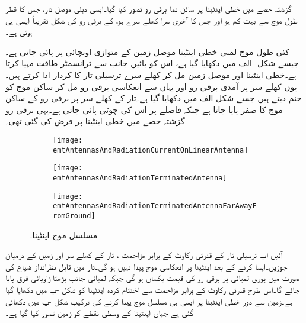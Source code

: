 گزشتہ حصے میں خطی اینٹینا پر سائن نما برقی رو تصور کیا گیا۔ایسی دبلی موصل تار، جس کا قطر  طول موج  سے بہت کم ہو  اور جس کا آخری سرا کھلے سرے ہو، کے برقی رو کی شکل تقریباً ایسی ہی ہوتی ہے۔

کئی طول موج لمبی خطی اینٹینا موصل زمین کے متوازی  اونچائی پر پائی جاتی ہے۔ جیسے شکل -الف میں دکھایا گیا ہے، اس کو بائیں جانب سے ٹرانسمٹر طاقت مہیا کرتا ہے۔خطی اینٹینا اور موصل زمین مل کر کھلے سرے ترسیلی تار کا کردار ادا کرتے ہیں۔یوں کھلے سر پر آمدی برقی رو اور یہاں سے انعکاسی برقی رو مل کر ساکن موج کو جنم دیتے ہیں جسے شکل-الف میں دکھایا گیا ہے۔تار کے کھلے سر پر برقی رو کے ساکن موج کا صفر پایا جاتا ہے جبکہ   فاصلے پر اس کی چوٹی پائی جاتی ہے۔یہی برقی رو گزشتہ حصے میں خطی اینٹینا پر فرض کی گئی تھی۔

\begin{figure}
\centering
\begin{subfigure}{1\textwidth}
\centering
\texttt{[image: emtAntennasAndRadiationCurrentOnLinearAntenna]}
\end{subfigure}
\par\bigskip
\begin{subfigure}{1\textwidth}
\centering
\texttt{[image: emtAntennasAndRadiationTerminatedAntenna]}
\end{subfigure}
\par\bigskip
\begin{subfigure}{1\textwidth}
\centering
\texttt{[image: emtAntennasAndRadiationTerminatedAntennaFarAwayFromGround]}
\end{subfigure}
\caption{مسلسل موج اینٹینا۔}
\label{شکل_اینٹینا_موصل_سطح_خطی_اینٹینا_رو}
\end{figure}

آئیں اب ترسیلی تار کے قدرتی رکاوٹ کے برابر مزاحمت ،  تار کے کھلے سر اور زمین کے درمیان جوڑیں۔ایسا کرنے کے بعد اینٹینا پر انعکاسی موج پیدا نہیں ہو گی۔تار میں قابل نظرانداز ضیاع کی صورت میں پوری لمبائی پر برقی رو کی قیمت یکساں ہو گی جبکہ لمبائی جانب بڑھتا زاویائی فرق پایا جائے گا۔اس طرح قدرتی رکاوٹ کے برابر مزاحمت سے اختتام کردہ اینٹینا کو شکل -ب میں دکھایا گیا ہے۔زمین سے دور خطی اینٹینا پر ایسی ہی مسلسل موج پیدا کرنے کی ترکیب شکل -پ میں دکھائی گئی ہے جہاں  اینٹینا کے وسطی نقطے کو زمین تصور کیا گیا ہے۔

